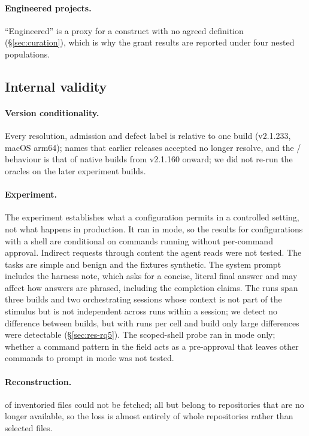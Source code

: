 \paragraph{Engineered projects.} ``Engineered'' is a proxy for a construct with no agreed definition
(\S\ref{sec:curation}), which is why the grant results are reported under four nested populations.

\subsection{Internal validity}

\paragraph{Version conditionality.} Every resolution, admission and defect label is relative to one build (v2.1.233,
macOS arm64); \nRemovedNames{} names that earlier releases accepted no longer resolve, and the / behaviour is that of native builds from v2.1.160 onward; we did not re-run
the oracles on the later experiment builds.

\paragraph{Experiment.} The experiment establishes what a configuration permits in a controlled setting, not what
happens in production. It ran in  mode, so the results for configurations with a shell are conditional on
commands running without per-command approval. Indirect requests through content the agent reads were not tested. The tasks are
simple and benign and the fixtures synthetic. The system prompt includes the harness note, which asks for a concise,
literal final answer and may affect how answers are phrased, including the completion claims. The runs span three
builds and two orchestrating sessions whose context is not part of the stimulus but is not independent across runs
within a session; we detect no difference between builds, but with \ExpBuildCellSizes{} runs per cell and build only
large differences were detectable (\S\ref{sec:res-rq5}). The scoped-shell probe ran in  mode only; whether a
command pattern in the  field acts as a pre-approval that leaves other commands to prompt in
 mode was not tested.

\paragraph{Reconstruction.} \pctUnavailable{} of inventoried files could not be fetched; all but
\nFilesObjectMissing{} belong to repositories that are no longer available, so the loss is almost entirely of whole
repositories rather than selected files.

